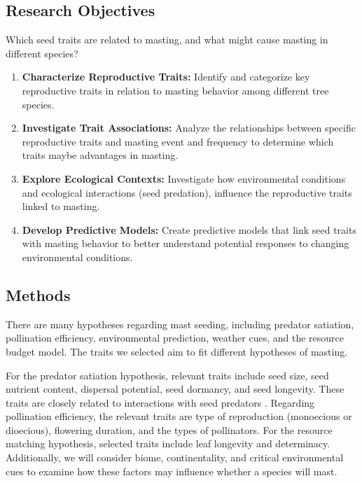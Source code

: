 \documentclass[11pt,letter]{article}
\begin{document}
\subsection{Research Objectives}
Which seed traits are related to masting, and what might cause masting in different species?
	\begin{enumerate}
	\item \textbf{Characterize Reproductive Traits:} Identify and categorize key reproductive traits in relation to masting behavior among different tree species.
	\item \textbf{Investigate Trait Associations:} Analyze the relationships between specific reproductive traits and masting event and frequency to determine which traits maybe advantages in masting.
	\item \textbf{Explore Ecological Contexts:} Investigate how environmental conditions and ecological interactions (seed predation), influence the reproductive traits linked to masting. %
	\item \textbf{Develop Predictive Models:} Create predictive models that link seed traits with masting behavior to better understand potential responses to changing environmental conditions. %
	\end{enumerate}
\subsection{Methods}
There are many hypotheses regarding mast seeding, including predator satiation, pollination efficiency, environmental prediction, weather cues, and the resource budget model. The traits we selected aim to fit different hypotheses of masting.

For the predator satiation hypothesis, relevant traits include seed size, seed nutrient content, dispersal potential, seed dormancy, and seed longevity. These traits are closely related to interactions with seed predators \citep{janzen1971seed}. Regarding pollination efficiency, the relevant traits are type of reproduction (monoecious or dioecious), flowering duration, and the types of pollinators. For the resource matching hypothesis, selected traits include leaf longevity and determinacy. Additionally, we will consider biome, continentality, and critical environmental cues to examine how these factors may influence whether a species will mast.
\end{document}
